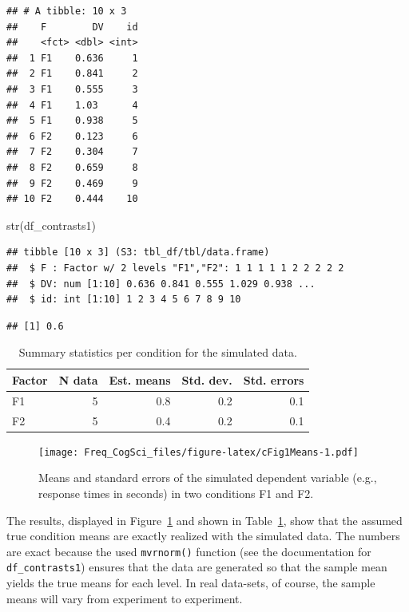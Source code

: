 \documentclass[
  12pt,
]{krantz}
\newenvironment{Shaded}{\begin{snugshade}}{\end{snugshade}}
\newcommand{\FunctionTok}[1]{\textcolor[rgb]{0.00,0.00,0.00}{#1}}
\newcommand{\NormalTok}[1]{#1}
\theoremstyle{definition}
\theoremstyle{definition}
\theoremstyle{definition}
\theoremstyle{definition}
\theoremstyle{remark}
\begin{document}
\begin{verbatim}
## # A tibble: 10 x 3
##    F        DV    id
##    <fct> <dbl> <int>
##  1 F1    0.636     1
##  2 F1    0.841     2
##  3 F1    0.555     3
##  4 F1    1.03      4
##  5 F1    0.938     5
##  6 F2    0.123     6
##  7 F2    0.304     7
##  8 F2    0.659     8
##  9 F2    0.469     9
## 10 F2    0.444    10
\end{verbatim}

\begin{Shaded}
\begin{Highlighting}[]
\FunctionTok{str}\NormalTok{(df\_contrasts1)}
\end{Highlighting}
\end{Shaded}

\begin{verbatim}
## tibble [10 x 3] (S3: tbl_df/tbl/data.frame)
##  $ F : Factor w/ 2 levels "F1","F2": 1 1 1 1 1 2 2 2 2 2
##  $ DV: num [1:10] 0.636 0.841 0.555 1.029 0.938 ...
##  $ id: int [1:10] 1 2 3 4 5 6 7 8 9 10
\end{verbatim}

\begin{verbatim}
## [1] 0.6
\end{verbatim}

\begin{table}[b]

\caption{\label{tab:cTab1Means}Summary statistics per condition for the simulated data.}
\centering
\begin{tabular}[t]{l|r|r|r|r}
\hline
Factor & N data & Est. means & Std. dev. & Std. errors\\
\hline
F1 & 5 & 0.8 & 0.2 & 0.1\\
\hline
F2 & 5 & 0.4 & 0.2 & 0.1\\
\hline
\end{tabular}
\end{table}

\begin{figure}
\centering
\texttt{[image: Freq\_CogSci\_files/figure-latex/cFig1Means-1.pdf]}
\caption{\label{fig:cFig1Means}Means and standard errors of the simulated dependent variable (e.g., response times in seconds) in two conditions F1 and F2.}
\end{figure}

The results, displayed in Figure~\ref{fig:cFig1Means} and shown in Table~\ref{tab:cTab1Means}, show that the assumed true condition means are exactly realized with the simulated data. The numbers are exact because the used \texttt{mvrnorm()} function (see the documentation for \texttt{df\_contrasts1}) ensures that the data are generated so that the sample mean yields the true means for each level. In real data-sets, of course, the sample means will vary from experiment to experiment.
\end{document}
